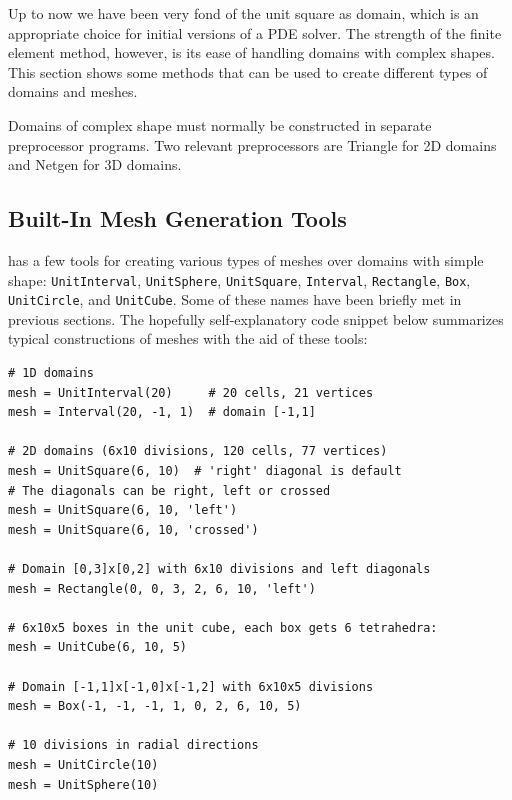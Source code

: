 Up to now we have been very fond of the unit square as domain,
which is an appropriate choice for initial versions of a
PDE solver. The strength of the finite element method, however, is its
ease of handling domains with complex shapes. This section
shows some methods that can be used to create different types of
domains and meshes.

Domains of complex shape must normally be constructed in separate
preprocessor programs. Two relevant preprocessors are Triangle for
2D domains and Netgen for 3D domains.

\subsection{Built-In Mesh Generation Tools}
\label{langtangen:prepro:builtin}

\dolfin{} has a few tools for creating various types of meshes over
domains with simple
shape:
{\fontsize{12pt}{12pt}\texttt{UnitInterval}},
{\fontsize{12pt}{12pt}\texttt{UnitSphere}},
{\fontsize{12pt}{12pt}\texttt{UnitSquare}},
{\fontsize{12pt}{12pt}\texttt{Interval}},
{\fontsize{12pt}{12pt}\texttt{Rectangle}},
{\fontsize{12pt}{12pt}\texttt{Box}},
{\fontsize{12pt}{12pt}\texttt{UnitCircle}},
and
{\fontsize{12pt}{12pt}\texttt{UnitCube}}.
Some of these names have been briefly met in previous sections.
The hopefully self-explanatory code snippet below summarizes
typical constructions of meshes with the aid of these tools:
\begin{Verbatim}[fontsize=\fontsize{10pt}{10pt},tabsize=8,baselinestretch=1.05,
fontfamily=tt,xleftmargin=7mm]
# 1D domains
mesh = UnitInterval(20)     # 20 cells, 21 vertices
mesh = Interval(20, -1, 1)  # domain [-1,1]

# 2D domains (6x10 divisions, 120 cells, 77 vertices)
mesh = UnitSquare(6, 10)  # 'right' diagonal is default
# The diagonals can be right, left or crossed
mesh = UnitSquare(6, 10, 'left')
mesh = UnitSquare(6, 10, 'crossed')

# Domain [0,3]x[0,2] with 6x10 divisions and left diagonals
mesh = Rectangle(0, 0, 3, 2, 6, 10, 'left')

# 6x10x5 boxes in the unit cube, each box gets 6 tetrahedra:
mesh = UnitCube(6, 10, 5)

# Domain [-1,1]x[-1,0]x[-1,2] with 6x10x5 divisions
mesh = Box(-1, -1, -1, 1, 0, 2, 6, 10, 5)

# 10 divisions in radial directions
mesh = UnitCircle(10)
mesh = UnitSphere(10)
\end{Verbatim}
\noindent

